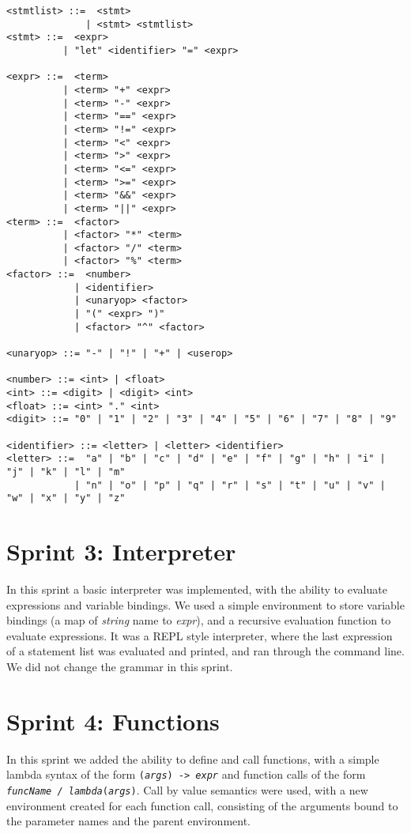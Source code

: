 \begin{verbatim}
<stmtlist> ::=  <stmt> 
              | <stmt> <stmtlist>
<stmt> ::=  <expr> 
          | "let" <identifier> "=" <expr>

<expr> ::=  <term> 
          | <term> "+" <expr> 
          | <term> "-" <expr>
          | <term> "==" <expr>
          | <term> "!=" <expr>
          | <term> "<" <expr>
          | <term> ">" <expr>
          | <term> "<=" <expr>
          | <term> ">=" <expr>
          | <term> "&&" <expr>
          | <term> "||" <expr>
<term> ::=  <factor> 
          | <factor> "*" <term> 
          | <factor> "/" <term> 
          | <factor> "%" <term> 
<factor> ::=  <number> 
            | <identifier> 
            | <unaryop> <factor>
            | "(" <expr> ")" 
            | <factor> "^" <factor>

<unaryop> ::= "-" | "!" | "+" | <userop>

<number> ::= <int> | <float>
<int> ::= <digit> | <digit> <int>
<float> ::= <int> "." <int>
<digit> ::= "0" | "1" | "2" | "3" | "4" | "5" | "6" | "7" | "8" | "9"

<identifier> ::= <letter> | <letter> <identifier>
<letter> ::=  "a" | "b" | "c" | "d" | "e" | "f" | "g" | "h" | "i" | "j" | "k" | "l" | "m" 
            | "n" | "o" | "p" | "q" | "r" | "s" | "t" | "u" | "v" | "w" | "x" | "y" | "z"
\end{verbatim}

\section{Sprint 3: Interpreter}\label{sec:interpreter}

In this sprint a basic interpreter was implemented, with the ability to evaluate expressions and variable bindings.
We used a simple environment to store variable bindings (a map of \textit{string} name to \textit{expr}), and a 
recursive evaluation function to evaluate expressions.
It was a REPL style interpreter, where the last expression of a statement list was evaluated and printed, and ran through
the command line.
We did not change the grammar in this sprint.

\section{Sprint 4: Functions}\label{sec:functions}

In this sprint we added the ability to define and call functions, with a simple lambda syntax of the form 
\texttt{(\textit{args}) -> \textit{expr}} and function calls of the form \texttt{\textit{funcName / lambda}(\textit{args})}.
Call by value semantics were used, with a new environment created for each function call, consisting of the arguments
bound to the parameter names and the parent environment.

